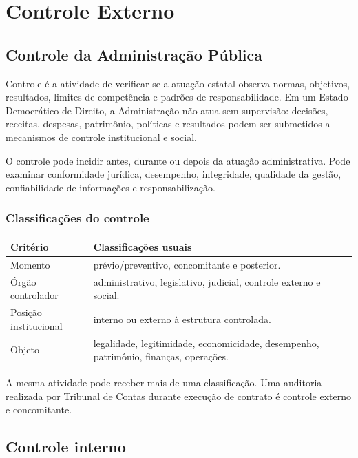 \chapter{Controle Externo}

\section{Controle da Administração Pública}

Controle é a atividade de verificar se a atuação estatal observa normas, objetivos, resultados, limites de competência e padrões de responsabilidade. Em um Estado Democrático de Direito, a Administração não atua sem supervisão: decisões, receitas, despesas, patrimônio, políticas e resultados podem ser submetidos a mecanismos de controle institucional e social.

O controle pode incidir antes, durante ou depois da atuação administrativa. Pode examinar conformidade jurídica, desempenho, integridade, qualidade da gestão, confiabilidade de informações e responsabilização.

\subsection{Classificações do controle}

\begin{table}[ht]
\centering
\small
\begin{tabularx}{\textwidth}{l X}
\toprule
Critério & Classificações usuais \\
\midrule
Momento & prévio/preventivo, concomitante e posterior. \\
Órgão controlador & administrativo, legislativo, judicial, controle externo e social. \\
Posição institucional & interno ou externo à estrutura controlada. \\
Objeto & legalidade, legitimidade, economicidade, desempenho, patrimônio, finanças, operações. \\
\bottomrule
\end{tabularx}
\end{table}

A mesma atividade pode receber mais de uma classificação. Uma auditoria realizada por Tribunal de Contas durante execução de contrato é controle externo e concomitante.

\section{Controle interno}

